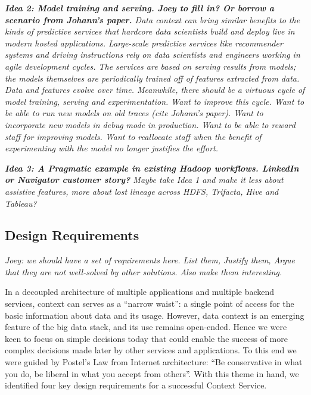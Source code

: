 \documentclass{sig-alternate}
\begin{document}


\emph{\textbf{Idea 2: Model training and serving.  Joey to fill in? Or borrow a scenario from Johann's paper.} 
Data context can bring similar benefits to the kinds of predictive services that hardcore data scientists build and deploy live in modern hosted applications.  Large-scale predictive services like recommender systems and driving instructions rely on data scientists and engineers working in agile development cycles.  The services are based on serving results from models; the models themselves are periodically trained off of features extracted from data. Data and features evolve over time. Meanwhile, there should be a virtuous cycle of model training, serving and experimentation.  Want to improve this cycle. Want to be able to run new models on old traces (cite Johann's paper). Want to incorporate new models in debug mode in production. Want to be able to reward staff for improving models. Want to reallocate staff when the benefit of experimenting with the model no longer justifies the effort.}

\emph{\textbf{Idea 3: A Pragmatic example in existing Hadoop workflows.  LinkedIn or Navigator customer story?}  Maybe take Idea 1 and make it less about assistive features, more about lost lineage across HDFS, Trifacta, Hive and Tableau?}

\subsection{Design Requirements}
\emph{Joey: we should have a set of requirements here. List them, Justify them, Argue that they are not well-solved by other solutions.  Also make them interesting.}

In a decoupled architecture of multiple applications and multiple backend services, context can serves as a ``narrow waist'': a single point of access for the basic information about data and its usage. However, data context is an emerging feature of the big data stack, and its use remains open-ended. Hence we were keen to focus on simple decisions today that could enable the success of more complex decisions made later by other services and applications. To this end we were guided by Postel's Law from Internet architecture: ``Be conservative in what you do, be liberal in what you accept from others''.  With this theme in hand, we identified four key design requirements for a successful Context Service.
\end{document}
